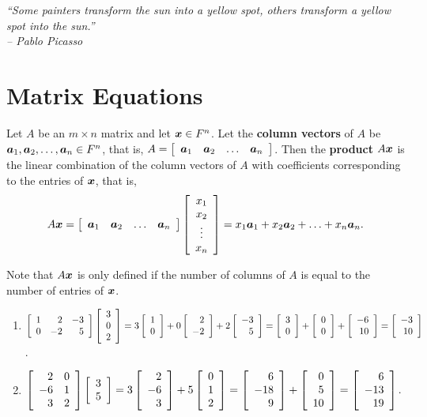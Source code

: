 \begin{center} 
\emph{``Some painters transform the sun into a yellow spot, others transform a yellow spot into the sun.''\\
-- Pablo Picasso}
\end{center}

\section{Matrix Equations}\label{sec:column}
\begin{Def} Let $A$ be  an $m\times n$ matrix and let $\bb x \in F^n$. Let the \textbf{column vectors} of $A$ be $\bb a_1, \bb a_2, \ldots, \bb a_n \in F^n$, that is, $A = \mtx{cccc}{\bb a_1 & \bb a_2 & \ldots & \bb a_n}$. Then the \textbf{product} $A\bb x$ is the linear combination of the column vectors of $A$ with coefficients corresponding to the entries of $\bb x$, that is, 
\begin{equation}\label{eq:matrixeqn} A\bb x =  \mtx{cccc}{\bb a_1 & \bb a_2 & \ldots & \bb a_n}\mtx{c}{x_1 \\ x_2 \\ \vdots \\ x_n} = x_1\bb a_1  + x_2\bb a_2 + \ldots + x_n\bb a_n.\end{equation}
\end{Def}\vs

Note that $A\bb x$ is only defined if the number of columns of $A$ is equal to the number of entries of $\bb x$.\\

\begin{Exam}\mbox{}
\begin{enumerate}
\item $\mtx{rrr}{1 & 2 & -3\\ 0 & -2 & 5}\vr{3 \\ 0 \\ 2} = 3\vr{1\\0} + 0\vr{2\\-2} + 2\vr{-3\\5} = \vr{3\\0} + \vr{0\\0} + \vr{-6\\10} = \vr{-3\\10}$.\\

\item $\mtx{rr}{2 & 0\\ -6 & 1 \\ 3 & 2}\vr{3\\5} = 3\vr{2\\-6\\3} + 5\vr{0\\1\\2} = \vr{6\\-18\\9} + \vr{0\\5\\10} = \vr{6\\-13\\19}$.
\end{enumerate}
\end{Exam}\vs

